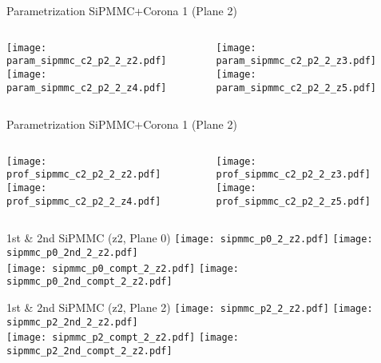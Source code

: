 \documentclass{beamer}
\begin{document}
\begin{frame}{Parametrization SiPMMC+Corona 1 (Plane 2)}
	\begin{columns}[onlytextwidth]
		\begin{column}{0.5\textwidth}
			\texttt{[image: param\_sipmmc\_c2\_p2\_2\_z2.pdf]} \\
			\texttt{[image: param\_sipmmc\_c2\_p2\_2\_z4.pdf]}
		 \end{column}
		 \begin{column}{0.5\textwidth}
			\texttt{[image: param\_sipmmc\_c2\_p2\_2\_z3.pdf]} \\
			\texttt{[image: param\_sipmmc\_c2\_p2\_2\_z5.pdf]}
		 \end{column}
 \end{columns}
\end{frame}

\begin{frame}{Parametrization SiPMMC+Corona 1 (Plane 2)}
	\begin{columns}[onlytextwidth]
		\begin{column}{0.5\textwidth}
			\texttt{[image: prof\_sipmmc\_c2\_p2\_2\_z2.pdf]} \\
			\texttt{[image: prof\_sipmmc\_c2\_p2\_2\_z4.pdf]}
		 \end{column}
		 \begin{column}{0.5\textwidth}
			\texttt{[image: prof\_sipmmc\_c2\_p2\_2\_z3.pdf]} \\
			\texttt{[image: prof\_sipmmc\_c2\_p2\_2\_z5.pdf]}
		 \end{column}
 \end{columns}
\end{frame}

\begin{frame}{1st \& 2nd SiPMMC (z2, Plane 0)}
	\texttt{[image: sipmmc\_p0\_2\_z2.pdf]}
	\texttt{[image: sipmmc\_p0\_2nd\_2\_z2.pdf]} \\
	
		\texttt{[image: sipmmc\_p0\_compt\_2\_z2.pdf]}
		\texttt{[image: sipmmc\_p0\_2nd\_compt\_2\_z2.pdf]}
\end{frame}

\begin{frame}{1st \& 2nd SiPMMC (z2, Plane 2)}
	\texttt{[image: sipmmc\_p2\_2\_z2.pdf]}
	\texttt{[image: sipmmc\_p2\_2nd\_2\_z2.pdf]} \\
	
		\texttt{[image: sipmmc\_p2\_compt\_2\_z2.pdf]}
		\texttt{[image: sipmmc\_p2\_2nd\_compt\_2\_z2.pdf]}
\end{frame}
\end{document}

